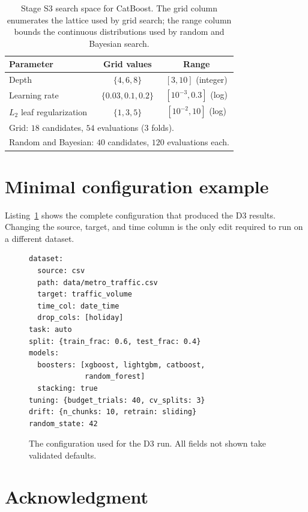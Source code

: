 \documentclass{ieeeaccess}
\begin{document}
\begin{table}[h]
\caption{Stage S3 search space for CatBoost. The grid column enumerates the lattice used by grid search; the range column bounds the continuous distributions used by random and Bayesian search.}
\label{tab:space}
\centering
\footnotesize
\setlength{\tabcolsep}{3pt}
\begin{tabular}{lcc}
\toprule
Parameter & Grid values & Range \\
\midrule
Depth & $\{4, 6, 8\}$ & $[3, 10]$ (integer) \\
Learning rate & $\{0.03, 0.1, 0.2\}$ & $[10^{-3}, 0.3]$ (log) \\
$L_2$ leaf regularization & $\{1, 3, 5\}$ & $[10^{-2}, 10]$ (log) \\
\midrule
\multicolumn{3}{l}{Grid: $18$ candidates, $54$ evaluations ($3$ folds).} \\
\multicolumn{3}{l}{Random and Bayesian: $40$ candidates, $120$ evaluations each.} \\
\bottomrule
\end{tabular}
\end{table}

\section{Minimal configuration example}
\label{app:config}
Listing~\ref{lst:config} shows the complete configuration that produced the D3 results. Changing the source, target, and time column is the only edit required to run on a different dataset.

\begin{figure}[h]
\footnotesize
\begin{verbatim}
dataset:
  source: csv
  path: data/metro_traffic.csv
  target: traffic_volume
  time_col: date_time
  drop_cols: [holiday]
task: auto
split: {train_frac: 0.6, test_frac: 0.4}
models:
  boosters: [xgboost, lightgbm, catboost,
             random_forest]
  stacking: true
tuning: {budget_trials: 40, cv_splits: 3}
drift: {n_chunks: 10, retrain: sliding}
random_state: 42
\end{verbatim}
\caption{The configuration used for the D3 run. All fields not shown take validated defaults.}
\label{lst:config}
\end{figure}

\section*{Acknowledgment}
\end{document}
